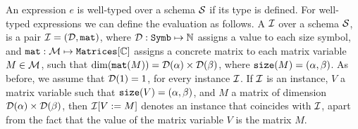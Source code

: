 An expression $e$ is well-typed over a schema $\mathcal{S}$ if its type is defined. For well-typed expressions we can define the evaluation as follows.
%
A  $\mathcal{I}$ over a schema $\mathcal{S}$, is a pair $\mathcal{I} = (\mathcal{D},\texttt{mat})$, where $\mathcal{D} : \texttt{Symb} \mapsto \mathbb{N}$ assigns a value to each size symbol, and $\texttt{mat} : \mathcal{M} \mapsto \texttt{Matrices}[\mathbb{C}]$ assigns a concrete matrix to each matrix variable $M\in \mathcal{M}$, such that $\dim(\texttt{mat}(M)) = \mathcal{D}(\alpha)\times \mathcal{D}(\beta)$, where $\texttt{size}(M) = (\alpha,\beta)$. As before, we assume that $\mathcal{D}(1) = 1$, for every instance $\mathcal{I}$. 
If $\mathcal{I}$ is an instance, $V$ a matrix variable such that $\texttt{size}(V)= (\alpha,\beta)$, and $M$ a matrix of dimension $\mathcal{D}(\alpha)\times \mathcal{D}(\beta)$, then $\mathcal{I}[V := M]$ denotes an instance that coincides with $\mathcal{I}$, apart from the fact that the value of the matrix variable $V$ is the matrix $M$. 

